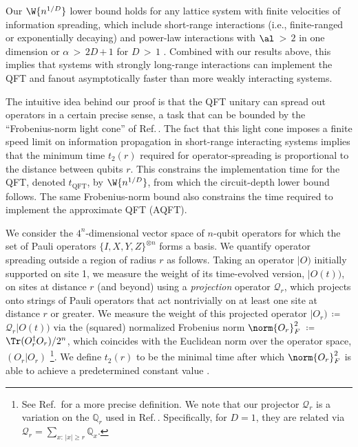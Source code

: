 Our $\W {n^{1/D}}$ lower bound holds for any lattice system with finite velocities of information spreading, which include short-range interactions (i.e., finite-ranged or exponentially decaying) and power-law interactions with $\al$\,$>$\,$2$ in one dimension or $\alpha$\,$>$\,$2D$\,$+$\,$1$ for $D$\,$>$\,$1$ \cite{Lieb1972,Chen2019,kuwaharaStrictlyLinearLight2020}.
Combined with our results above, this implies that systems with strongly long-range interactions can implement the QFT and fanout asymptotically faster than more weakly interacting systems.

The intuitive idea behind our proof is that the QFT unitary can spread out operators in a certain precise sense, a task that can be bounded by the ``Frobenius-norm light cone'' of Ref.\,\cite{Tran2020hierarchylinearlightcones}.
The fact that this light cone imposes a finite speed limit on information propagation in short-range interacting systems implies that the minimum time $t_2(r)$ required for operator-spreading is proportional to the distance between qubits $r$.
This constrains the implementation time for the QFT, denoted $t_\mathrm{QFT}$, by $\W {n^{1/D}}$, from which the circuit-depth lower bound follows.
The same Frobenius-norm bound also constrains the time required to implement the approximate QFT (AQFT).

We consider the $4^n$-dimensional vector space of $n$-qubit operators for which the set of Pauli operators $\{I,X,Y,Z\}^{\otimes n}$ forms a basis.
We quantify operator spreading outside a region of radius $r$ as follows.
Taking an operator $|O)$ initially supported on site 1, we measure the weight of its time-evolved version, $|O(t))$, on sites at distance $r$ (and beyond) using a \emph{projection} operator $\mathcal{Q}_{r}$, which projects onto strings of Pauli operators that act nontrivially on at least one site at distance $r$ or greater.
We measure the weight of this projected operator $|O_r)$\,$\coloneqq$\,$\mathcal{Q}_{r}|O(t))$ via the (squared) normalized Frobenius norm $\norm{O_r}_F^2$\,$\coloneqq$\,$\Tr(O_r^\dag O_r)/2^n$, which coincides with the Euclidean norm over the operator space, $(O_r|O_r)$ \footnote{See Ref.\,\cite{Tran2020} for a more precise definition.
    We note that our projector $\mathcal{Q}_r$ is a variation on the $\mathbb{Q}_r$ used in {Ref.\,\cite{Tran2020}}.
    Specifically, for $D=1$, they are related via $\mathcal{Q}_r = \sum_{x:\,|x|\ge r} \mathbb{Q}_x$.}.
We define $t_2(r)$ to be the minimal time after which $\norm{O_r}_F^2$ is able to achieve a predetermined constant value \cite{Tran2020hierarchylinearlightcones}.

